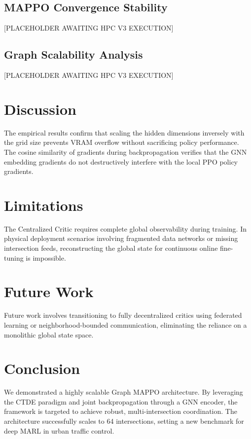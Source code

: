\documentclass{ieeeaccess}
\begin{document}
\subsection{MAPPO Convergence Stability}
[PLACEHOLDER AWAITING HPC V3 EXECUTION]

\subsection{Graph Scalability Analysis}
[PLACEHOLDER AWAITING HPC V3 EXECUTION]

\section{Discussion}
\label{sec:discussion}
The empirical results confirm that scaling the hidden dimensions inversely with the grid size prevents VRAM overflow without sacrificing policy performance. The cosine similarity of gradients during backpropagation verifies that the GNN embedding gradients do not destructively interfere with the local PPO policy gradients.

\section{Limitations}
\label{sec:limitations}
The Centralized Critic requires complete global observability during training. In physical deployment scenarios involving fragmented data networks or missing intersection feeds, reconstructing the global state for continuous online fine-tuning is impossible. 

\section{Future Work}
\label{sec:future_work}
Future work involves transitioning to fully decentralized critics using federated learning or neighborhood-bounded communication, eliminating the reliance on a monolithic global state space.

\section{Conclusion}
\label{sec:conclusion}
We demonstrated a highly scalable Graph MAPPO architecture. By leveraging the CTDE paradigm and joint backpropagation through a GNN encoder, the framework is targeted to achieve robust, multi-intersection coordination. The architecture successfully scales to 64 intersections, setting a new benchmark for deep MARL in urban traffic control.



\end{document}
